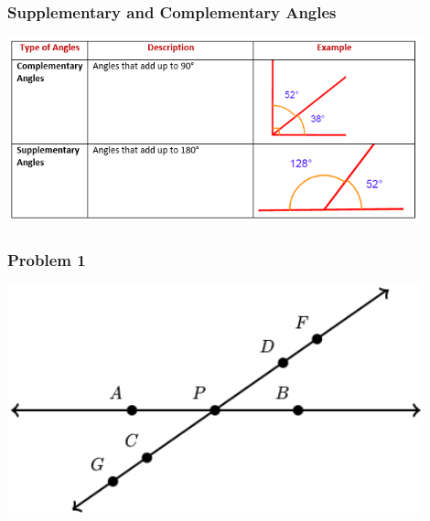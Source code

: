 \documentclass{beamer}
\begin{document}
\begin{frame}
    \frametitle{Supplementary and Complementary Angles}
       
    \begin{center}
        \includegraphics[width=0.9\textwidth]{complementary_supplementary_angles.png} %
    \end{center}

\end{frame}

\begin{frame}
    \frametitle{Problem 1}
    
    \begin{center}
        \includegraphics[width=0.9\textwidth]{supplementary_angles.png} %
    \end{center}

\end{frame} 
\end{document}
